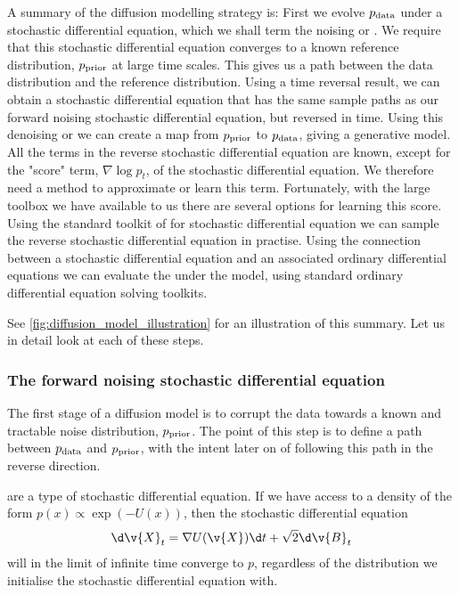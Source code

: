 A summary of the diffusion modelling strategy is:
\1 First we evolve \(p_{\text{data}}\) under a stochastic differential equation, which we shall term the noising or .
We require that this stochastic differential equation converges to a known reference distribution, \(p_{\text{prior}}\) at large time scales.
This gives us a path between the data distribution and the reference distribution.
\2 Using a time reversal result, we can obtain a stochastic differential equation that has the same sample paths as our forward noising stochastic differential equation, but reversed in time.
Using this denoising or  we can create a map from \(p_{\text{prior}}\) to \(p_{\text{data}}\), giving a generative model.
\3 All the terms in the reverse stochastic differential equation are known, except for the "score" term, \(\nabla \log p_t\), of the stochastic differential equation.
We therefore need a method to approximate or learn this term.
Fortunately, with the large  toolbox we have available to us there are several options for learning this score.
\4 Using the standard toolkit of  for stochastic differential equation we can sample the reverse stochastic differential equation in practise.
\5 Using the connection between a stochastic differential equation and an associated ordinary differential equations we can evaluate the  under the model, using standard ordinary differential equation solving toolkits.
\0

See \cref{fig:diffusion_model_illustration} for an illustration of this summary.
Let us in detail look at each of these steps. 

\subsubsection{The forward noising stochastic differential equation}

The first stage of a diffusion model is to corrupt the data towards a known and tractable noise distribution, \(p_{\text{prior}}\).
The point of this step is to define a path between \(p_{\text{data}}\) and \(p_{\text{prior}}\), with the intent later on of following this path in the reverse direction.

 are a type of stochastic differential equation.
If we have access to a density of the form \(p(x) \propto \exp(-U(x))\), then the stochastic differential equation \[\d \v{X}_t = \nabla U(\v{X}) \d t + \sqrt{2} \d \v{B}_t\] will in the limit of infinite time converge to \(p\), regardless of the distribution we initialise the stochastic differential equation with.

